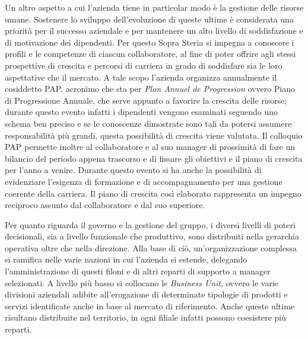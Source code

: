 	Un altro aspetto a cui l'azienda tiene in particolar modo è la gestione delle risorse umane. Sostenere lo sviluppo dell'evoluzione di queste ultime è considerata una priorità per il successo aziendale e per mantenere un alto livello di soddisfazione e di motivazione dei dipendenti. Per questo Sopra Steria si impegna a conoscere i profili e le competenze di ciascun collaboratore, al fine di poter offrire agli stessi prospettive di crescita e percorsi di carriera in grado di soddisfare sia le loro aspettative che il mercato. A tale scopo l'azienda organizza annualmente il cosiddetto PAP, acronimo che sta per \textit{Plan Annuel de Progression} ovvero Piano di Progressione Annuale, che serve appunto a favorire la crescita delle risorse; durante questo evento infatti i dipendenti vengono esaminati seguendo uno schema ben preciso e se le conoscenze dimostrate sono tali da potersi assumere responsabilità più grandi, questa possibilità di crescita viene valutata. Il colloquio PAP permette inoltre al collaboratore e al suo manager di prossimità di fare un bilancio del periodo appena trascorso e di fissare gli obiettivi e il piano di crescita per l'anno a venire. Durante questo evento si ha anche la possibilità di evidenziare l'esigenza di formazione e di accompagnamento per una gestione coerente della carriera. Il piano di crescita così elaborato rappresenta un impegno reciproco assunto dal collaboratore e dal suo superiore.%
	
	
	Per quanto riguarda il governo e la gestione del gruppo, i diversi livelli di poteri decisionali, sia a livello funzionale che produttivo, sono distribuiti nella gerarchia operativa oltre che nella direzione. Alla base di ciò, un'organizzazione complessa si ramifica nelle varie nazioni in cui l'azienda si estende, delegando l'amministrazione di questi filoni e di altri reparti di supporto a manager selezionati. A livello più basso si collocano le \textit{Business Unit}, ovvero le varie divisioni aziendali adibite all'erogazione di determinate tipologie di prodotti e servizi identificate anche in base al mercato di riferimento. Anche queste ultime risultano distribuite nel territorio, in ogni filiale infatti possono coesistere più reparti.\\
	
